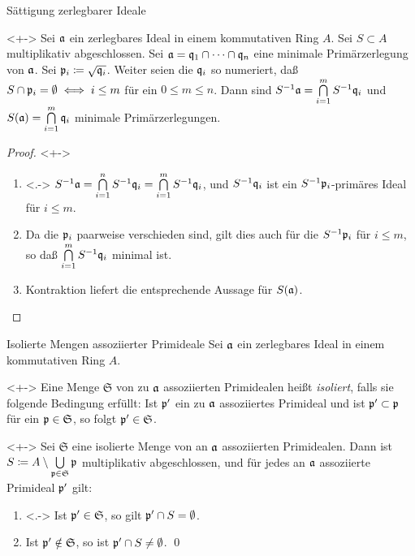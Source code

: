 \begin{frame}{Sättigung zerlegbarer Ideale}
	\begin{proposition}<+->
		\label{prop:sat_decomp}
		Sei \(\mathfrak{a}\) ein zerlegbares Ideal in einem kommutativen Ring \(A\).
		Sei \(S \subset A\) multiplikativ abgeschlossen. Sei
		\(\mathfrak{a} = \mathfrak{q}_1 \cap \dotsb \cap \mathfrak{q}_n\) eine minimale
		Primärzerlegung von \(\mathfrak{a}\). Sei \(\mathfrak{p}_i \coloneqq
		\sqrt{\mathfrak{q}_i}\). Weiter seien die \(\mathfrak{q}_i\) so
		numeriert, daß \(S \cap \mathfrak{p}_i = \emptyset \iff
		i \leq m\) für ein \(0 \leq m \leq n\). Dann sind
		\(S^{-1} \mathfrak{a} = \bigcap\limits_{i = 1}^m S^{-1} \mathfrak{q}_i\)
		und \(S(\mathfrak{a}) = \bigcap\limits_{i = 1}^m \mathfrak{q}_i\)
		minimale Primärzerlegungen.
	\end{proposition}
	\begin{proof}<+->
		\begin{enumerate}[<+->]
		\item<.->
			\(S^{-1} \mathfrak{a} = \bigcap\limits_{i = 1}^n S^{-1} \mathfrak{q}_i
			= \bigcap\limits_{i = 1}^m S^{-1} \mathfrak{q}_i\), und
			\(S^{-1} \mathfrak{q}_i\) ist ein
			\(S^{-1} \mathfrak{p}_i\)-primäres Ideal für \(i \leq m\).
		\item
			Da die \(\mathfrak{p}_i\) paarweise verschieden sind, gilt dies auch
			für die \(S^{-1} \mathfrak{p}_i\) für \(i \leq m\), so daß
			\(\bigcap\limits_{i = 1}^m S^{-1} \mathfrak{q}_i\) minimal ist.
		\item
			Kontraktion liefert die entsprechende Aussage
			für \(S(\mathfrak{a})\).
			\qedhere
		\end{enumerate}
	\end{proof}
\end{frame}

\begin{frame}{Isolierte Mengen assoziierter Primideale}
	Sei \(\mathfrak{a}\) ein zerlegbares Ideal in einem kommutativen Ring \(A\).
	\begin{definition}<+->
		Eine Menge \(\mathfrak S\) von zu \(\mathfrak{a}\) assoziierten Primidealen
		heißt \emph{isoliert}, falls sie folgende Bedingung erfüllt: Ist
		\(\mathfrak{p}'\) ein zu \(\mathfrak{a}\) assoziiertes Primideal und ist
		\(\mathfrak{p}' \subset \mathfrak{p}\) für ein \(\mathfrak{p} \in \mathfrak S\),
		so folgt \(\mathfrak{p}' \in \mathfrak S\).
	\end{definition}
	\begin{proposition}<+->
		Sei \(\mathfrak S\) eine isolierte Menge von an \(\mathfrak{a}\)
		assoziierten Primidealen. Dann ist \(S \coloneqq A \setminus
		\bigcup\limits_{\mathfrak{p} \in \mathfrak S} \mathfrak{p}\) multiplikativ
		abgeschlossen, und für jedes an \(\mathfrak{a}\) assoziierte Primideal
		\(\mathfrak{p}'\) gilt:
		\begin{enumerate}[<+->]
		\item<.->
			Ist \(\mathfrak{p}' \in \mathfrak S\), so gilt
			\(\mathfrak{p}' \cap S = \emptyset\).
		\item
			Ist \(\mathfrak{p}' \notin \mathfrak S\), so ist
			\(\mathfrak{p}' \cap S \neq \emptyset\).
			\qed
		\end{enumerate}
	\end{proposition}
\end{frame}

